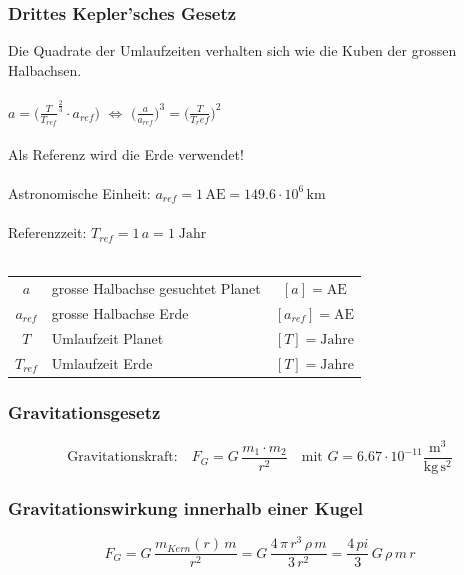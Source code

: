 		\subsubsection{Drittes Kepler'sches Gesetz}
			Die Quadrate der Umlaufzeiten verhalten sich wie die Kuben der grossen Halbachsen. \\
			\\
			$a = \big(  \frac{T}{T_{ref}}^{\frac{2}{3}} \cdot a_{ref} \big)$ \qquad $\Leftrightarrow$ \qquad $\big( \frac{a}{a_{ref}}  \big)^3 =  \big( \frac{T}{T_ref}  \big)^2 $ \\
			\\
			Als Referenz wird die Erde verwendet! \\
			\\
			Astronomische Einheit: $a_{ref} = 1 \, \mathrm{AE} = 149.6 \cdot 10^6 \, \mathrm{km}$ \\
			\\
			Referenzzeit: $T_{ref} = 1 \, a = 1 \; \mathrm{Jahr}$ \\
			\\
			\begin{tabular}{c l c}
				$a$ & grosse Halbachse gesuchtet Planet & $[a] = \mathrm{AE}$ \\
				$a_{ref}$ &  grosse Halbachse Erde & $[a_{ref}] = \mathrm{AE}$ \\	
				$T$ & Umlaufzeit Planet & $[T] = \mathrm{Jahre}$ \\
				$T_{ref}$ & Umlaufzeit Erde & $[T] = \mathrm{Jahre}$ \\
			\end{tabular}

		\subsubsection{Gravitationsgesetz}
		
			$$ \boxed{ \text{Gravitationskraft:}  \quad F_G = G \, \frac{m_1 \cdot m_2}{r^2} \quad \text{mit }G = 6.67 \cdot 10^{-11} \mathrm{\frac{m^3}{kg \, s^2}} }$$ 

		\subsubsection{Gravitationswirkung innerhalb einer Kugel}
		
			$$ \boxed{ F_G = G \, \frac{m_{Kern} (r) \, m}{r^2} =  G \, \frac{4 \, \pi \, r^3 \, \rho \, m}{3 \, r^2} = \frac{4 \, pi}{3} \, G \, \rho \, m \, r } $$ \\
		
